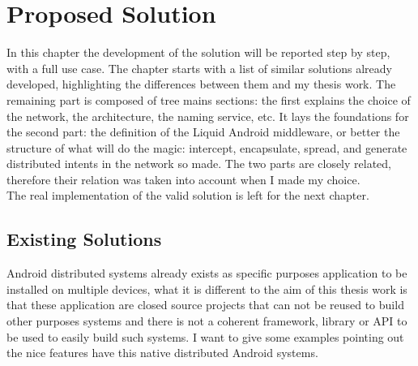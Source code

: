 %
%
\chapter{Proposed Solution}
%
\label{cap:proposedsolution}
%
%
\par In this chapter the development of the solution will be reported step by step, with a full use case. The chapter starts with a list of similar solutions already developed, highlighting the differences between them and my thesis work. The remaining part is composed of tree mains sections: the first explains the choice of the network, the architecture, the naming service, etc. It lays the foundations for the second part: the definition of the Liquid Android middleware, or better the structure of what will do the magic: intercept, encapsulate, spread, and generate distributed intents in the network so made. The two parts are closely related, therefore their relation was taken into account when I made my choice.\\
The real implementation of the valid solution is left for the next chapter.
%

\section{Existing Solutions }
Android distributed systems already exists as specific purposes application to be installed on multiple devices, what it is different to the aim of this thesis work is that these application are closed source projects that can not be reused to build other purposes systems and there is not a coherent framework, library or API to be used to easily build such systems.
I want to give some examples pointing out the nice features have this native distributed Android systems.
